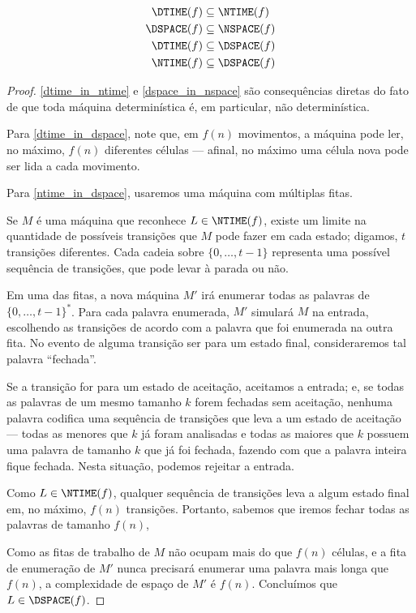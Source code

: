 \begin{proposition}
    \begin{align}
        \DTIME(f) &\subseteq \NTIME(f) \label{dtime_in_ntime} \\
        \DSPACE(f) &\subseteq \NSPACE(f) \label{dspace_in_nspace} \\
        \DTIME(f) &\subseteq \DSPACE(f) \label{dtime_in_dspace} \\
        \NTIME(f) &\subseteq \DSPACE(f) \label{ntime_in_dspace}
    \end{align}
\end{proposition}
\begin{proof}
    \ref{dtime_in_ntime} e \ref{dspace_in_nspace} são consequências diretas
    do fato de que toda máquina determinística é,
    em particular, não determinística.

    Para \ref{dtime_in_dspace},
    note que, em $f(n)$ movimentos,
    a máquina pode ler, no máximo,
    $f(n)$ diferentes células
    --- afinal, no máximo uma célula nova pode ser lida a cada movimento.

    Para \ref{ntime_in_dspace},
    usaremos uma máquina com múltiplas fitas.

    Se $M$ é uma máquina que reconhece $L \in \NTIME(f)$,
    existe um limite na quantidade de possíveis transições
    que $M$ pode fazer em cada estado;
    digamos, $t$ transições diferentes.
    Cada cadeia sobre $\{0, \dots, t-1\}$ representa uma possível
    sequência de transições,
    que pode levar à parada ou não.

    Em uma das fitas,
    a nova máquina $M'$
    irá enumerar todas as palavras de $\{0, \dots, t-1\}^*$.
    Para cada palavra enumerada,
    $M'$ simulará $M$ na entrada,
    escolhendo as transições de acordo com a palavra
    que foi enumerada na outra fita.
    No evento de alguma transição ser para um estado final,
    consideraremos tal palavra ``fechada''.

    Se a transição for para um estado de aceitação,
    aceitamos a entrada;
    e, se todas as palavras de um mesmo tamanho $k$
    forem fechadas sem aceitação,
    nenhuma palavra
    codifica uma sequência de transições
    que leva a um estado de aceitação
    --- todas as menores que $k$ já foram analisadas
    e todas as maiores que $k$
    possuem uma palavra de tamanho $k$ que já foi fechada,
    fazendo com que a palavra inteira fique fechada.
    Nesta situação, podemos rejeitar a entrada.

    Como $L \in \NTIME(f)$,
    qualquer sequência de transições leva a algum estado final
    em, no máximo, $f(n)$ transições.
    Portanto,
    sabemos que iremos fechar todas as palavras
    de tamanho $f(n)$,

    Como as fitas de trabalho de $M$
    não ocupam mais do que $f(n)$ células,
    e a fita de enumeração de $M'$
    nunca precisará enumerar uma palavra mais longa que $f(n)$,
    a complexidade de espaço de $M'$ é $f(n)$.
    Concluímos que $L \in \DSPACE(f)$.
\end{proof}
